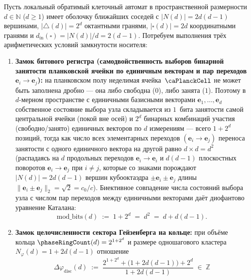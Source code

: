 \begin{theorem}[Диофантова единственность $d=3$ ($1+2^d=d^2$), единственность начального вектора $\mathrm{IV}(3)=263$ и полная замкнутость траектории $\symCapitalPsi^t = g^t(\mathrm{IV}(3))$]
\label{thm:catalan-uniqueness-d3}
Пусть локальный обратимый клеточный автомат в пространственной размерности $d\in\mathbb{N}$ ($d\ge 1$)
имеет оболочку ближайших соседей с $|N(d)| = 2d(d-1)$ вершинами, $|\triangle(d)| = 2^d$ октантными гранями,
$|\square(d)| = 2d$ координатными гранями и $d_{\mathrm{in}}(\square) = |N(d)|/d = 2(d-1)$.
Потребуем выполнения трёх арифметических условий замкнутости носителя:
\begin{enumerate}[label=(\roman*)]
\item \textbf{Замок битового регистра (самодвойственность выборов бинарной занятости планковской ячейки по единичным векторам и пар переходов $\mathbf{e}_i\to\mathbf{e}_j$):}
  на планковском полу неделимая ячейка~$\caPlanckCell$ не может быть заполнена дробно --- она либо свободна ($0$), либо занята ($1$). Поэтому в $d$-мерном пространстве с единичными базисными векторами $\mathbf{e}_1,\dots,\mathbf{e}_d$ собственное состояние выбора узла складывается из $1$~бита занятости самой центральной ячейки (покой вне осей) и $2^d$ бинарных комбинаций участия (свободно/занято) единичных векторов по $d$ измерениям --- всего $1+2^d$ позиций, тогда как число всех элементарных переходов $(\mathbf{e}_i\to\mathbf{e}_j)$ переноса занятости с одного единичного вектора на другой равно $d\times d = d^2$ (распадаясь на $d$ продольных переходов $\mathbf{e}_i\to\mathbf{e}_i$ и $d(d-1)$ плоскостных поворотов $\mathbf{e}_i\to\mathbf{e}_j$ при $i\ne j$, которые со знаками порождают $|N(d)|=2d(d-1)$ вершин кубооктаэдра $\pm\mathbf{e}_i\pm\mathbf{e}_j$ длины $\|\mathbf{e}_i\pm\mathbf{e}_j\|_2=\sqrt{2}=c_0/c$). Биективное совпадение числа состояний выбора узла с числом пар переходов между единичными векторами даёт диофантово уравнение Каталана:
  \begin{equation}
  \label{eq:catalan-lock}
    \mathrm{mod\_bits}(d) \;:=\; 1 + 2^d \;=\; d^2 \;=\; d + d(d-1).
  \end{equation}
\item \textbf{Замок целочисленности сектора Гейзенберга на кольце:} при объёме кольца $\phaseRingCount(d) = 2^{1+2^d}$
  и размере одношагового кластера $N_\varphi(d) = 1 + 2d(d-1)$ отношение
  \begin{equation}
  \label{eq:heisenberg-divisibility-lock}
    \Delta\varphi_{\mathrm{disc}}(d) \;:=\; \frac{2^{1+2^d} + \bigl(1 + 2d(d-1)\bigr) + 2^d}{1 + 2d(d-1)} \;\in\; \mathbb{Z}

\end{equation}
\end{enumerate}
\end{theorem}
